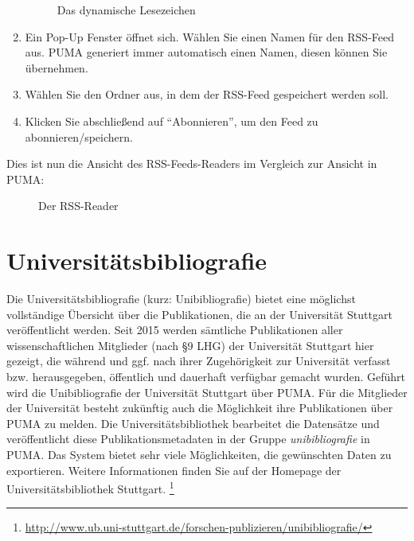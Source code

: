 \begin{enumerate}
\begin{figure}[h!]
 \caption{Das dynamische Lesezeichen}
 \label{figure055}
\end{figure}
    \item Ein Pop-Up Fenster öffnet sich. Wählen Sie einen Namen für den RSS-Feed aus. PUMA generiert immer automatisch einen Namen, diesen können Sie übernehmen.
    \item Wählen Sie den Ordner aus, in dem der RSS-Feed gespeichert werden soll.
    \item Klicken Sie abschließend auf \enquote{Abonnieren}, um den Feed zu abonnieren/speichern.
\end{enumerate}
Dies ist nun die Ansicht des RSS-Feeds-Readers im Vergleich zur Ansicht in PUMA:
\begin{figure}[h!]
 \centering
 \caption{Der RSS-Reader}
 \label{figure056}
\end{figure}
\section{Universitätsbibliografie}
Die Universitätsbibliografie (kurz: Unibibliografie) bietet eine möglichst vollständige Übersicht über die Publikationen, die an der Universität Stuttgart veröffentlicht werden. Seit 2015 werden sämtliche Publikationen aller wissenschaftlichen Mitglieder (nach §9 LHG) der Universität Stuttgart hier gezeigt, die während und ggf. nach ihrer Zugehörigkeit zur Universität verfasst bzw. herausgegeben, öffentlich und dauerhaft verfügbar gemacht wurden.\newline\newline
Geführt wird die Unibibliografie der Universität Stuttgart über PUMA. Für die Mitglieder der Universität besteht zukünftig auch die Möglichkeit ihre Publikationen über PUMA zu melden. Die Universitätsbibliothek bearbeitet die Datensätze und veröffentlicht diese Publikationsmetadaten in der Gruppe \textit{unibibliografie} in PUMA. Das System bietet sehr viele Möglichkeiten, die gewünschten Daten zu exportieren. Weitere Informationen finden Sie auf der Homepage der Universitätsbibliothek Stuttgart. \footnote{\url{http://www.ub.uni-stuttgart.de/forschen-publizieren/unibibliografie/}}
